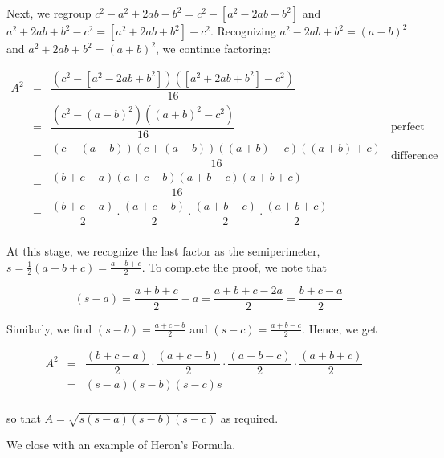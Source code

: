 \documentclass{ximera}
\begin{document}
Next, we regroup $c^2 - a^2 + 2ab - b^2 = c^2 - \left[a^2 - 2ab + b^2\right]$ and  $a^2 + 2ab + b^2- c^2 = \left[a^2 + 2ab + b^2\right]- c^2$.  Recognizing $a^2 - 2ab + b^2 = (a-b)^2$ and $a^2 + 2ab + b^2 = (a+b)^2$, we continue factoring:
	 	
\[ \begin{array}{rclr}

A^2	& = & \dfrac{\left(c^2 - \left[a^2 - 2ab + b^2\right] \right)  \left( \left[a^2 + 2ab + b^2\right]- c^2\right)}{16}  &  \\ [10pt]

	 	& = & \dfrac{\left(c^2 - (a-b)^2 \right)  \left( (a+b)^2- c^2\right)}{16}  &  \text{perfect square trinomials.}\\ [10pt]
	 	
	 	& = & \dfrac{ (c-(a-b))(c+(a-b))((a+b) -c)((a+b)+c)}{16}  &  \text{difference of squares.} \\ [10pt]
	 			 
	 	& = & \dfrac{ (b+c-a)(a+c-b)(a+b-c)(a+b+c)}{16}  &  \\ [10pt]	 	
	 	
	  & = & \dfrac{(b+c-a)}{2} \cdot \dfrac{(a+c-b)}{2} \cdot \dfrac{(a+b-c)}{2} \cdot \dfrac{(a+b+c)}{2}  &  \\ [10pt]	 
	 		
\end{array} \]

At this stage, we recognize the last factor as the semiperimeter, $s = \frac{1}{2}(a+b+c) = \frac{a+b+c}{2}$.  To complete the proof, we note that

\[ (s - a) = \dfrac{a+b+c}{2} - a = \dfrac{a+b+c-2a}{2} = \dfrac{b+c-a}{2} \]  
			
Similarly, we find $(s-b) = \frac{a+c-b}{2}$ and $(s-c) = \frac{a+b-c}{2}$.  Hence, we get

\[ \begin{array}{rclr}

A^2 & = & \dfrac{(b+c-a)}{2} \cdot \dfrac{(a+c-b)}{2} \cdot \dfrac{(a+b-c)}{2} \cdot \dfrac{(a+b+c)}{2}  &  \\ [10pt]	 
	 	
	 	& = & (s-a) (s-b) (s-c) s  &  \\ [10pt]	 	
	 	
\end{array} \]

so that  $A = \sqrt{s(s-a)(s-b)(s-c)}$ as required. 

\smallskip

We close with an example of Heron's Formula.
\end{document}
